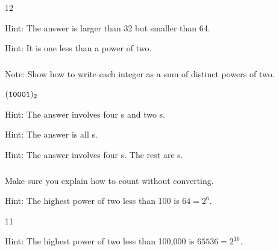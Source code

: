 \subsubsection*{ \answers}
\begin{apart}
    \item 12
    \item Hint: The answer is larger than 32 but smaller than 64.
    \item Hint: It is one less than a power of two.
\end{apart}

\subsubsection*{ \answers}
Note: Show how to write each integer as a sum of distinct powers of two.
\begin{apart}
    \item $(\texttt{10001})_2$
    \item Hint: The answer involves four s and two s.
    \item Hint: The answer is all s.
    \item Hint: The answer involves four s.  The rest are s.
\end{apart}

\subsubsection*{ \answers}
Make sure you explain how to count without converting.
\begin{apart}
    \item Hint: The highest power of two less than 100 is $64=2^6$.
    \item 11
    \item Hint: The highest power of two less than 100,000 is $65536=2^{16}$.
\end{apart}

